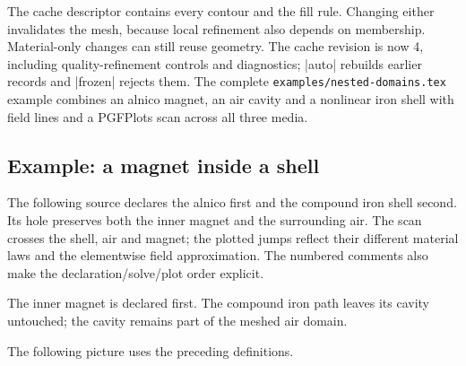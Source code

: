 The cache descriptor contains every contour and the fill rule. Changing
either invalidates the mesh, because local refinement also depends on
membership. Material-only changes can still reuse geometry. The cache
revision is now 4, including quality-refinement controls and diagnostics;
|auto| rebuilds earlier records and |frozen| rejects them.
The complete \texttt{examples/nested-domains.tex} example combines an alnico
magnet, an air cavity and a nonlinear iron shell with field lines and a
PGFPlots scan across all three media.

\subsection{Example: a magnet inside a shell}
The following source declares the alnico first and the compound iron
shell second. Its hole preserves both the inner magnet and the surrounding
air. The scan crosses the shell, air and magnet; the plotted jumps reflect
their different material laws and the elementwise field approximation.
The numbered comments also make the declaration/solve/plot order explicit.

The inner magnet is declared first. The compound iron path leaves its cavity untouched; the cavity remains part of the meshed air domain.


\begin{codeexample}
\end{codeexample}

The following picture uses the preceding definitions.


\begin{codeexample}[width=0pt]
\end{codeexample}

